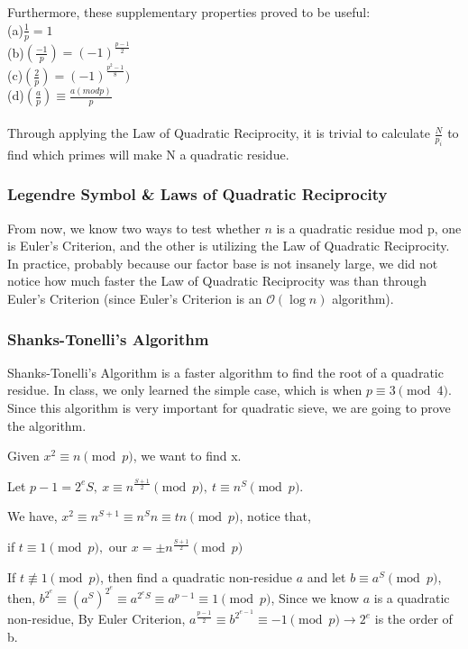 \documentclass[12pt]{article} %
\begin{document}
	\\\\Furthermore, these supplementary properties proved to be useful:
	\\(a)$\frac{1}{p} = 1$
	\\(b)$(\frac{-1}{p}) = (-1)^{\frac{p-1}{2}}$
	\\(c)$(\frac{2}{p}) = (-1)^{\frac{p^{2}-1}{8}})$
	\\(d)$(\frac{a}{p}) \equiv \frac{a(mod p)}{p}$
	\\\\
	Through applying the Law of Quadratic Reciprocity, it is trivial to calculate $\frac{N}{p_i}$ to find which primes will make N a quadratic residue.
	
	\subsubsection{Legendre Symbol \& Laws of Quadratic Reciprocity}
	
	From now, we know two ways to test whether $n$ is a quadratic residue mod p, one is Euler's Criterion, and the other is utilizing the Law of Quadratic Reciprocity. In practice, probably because our factor base is not insanely large, we did not notice how much faster the Law of Quadratic Reciprocity was than through Euler's Criterion (since Euler's Criterion is an $\mathcal{O}(\log{n}) $ algorithm).
	
	\subsubsection{Shanks-Tonelli's Algorithm}
	
	Shanks-Tonelli's Algorithm is a faster algorithm to find the root of a quadratic residue. In class, we only learned the simple case, which is when $p \equiv 3 \pmod{4}$. Since this algorithm is very important for quadratic sieve, we are going to prove the algorithm.
	
	Given $x^2 \equiv n \pmod{p} $, we want to find x.
	
	Let $p-1 = 2^eS,\ x \equiv n^{\frac{S+1}{2}} \pmod{p},\ t \equiv n^S \pmod{p}.$
	
	We have, $x^2 \equiv n^{S+1} \equiv n^Sn \equiv tn \pmod{p}$, notice that, 
	
	if $t \equiv 1 \pmod{p},$ our $x = \pm n^{\frac{S+1}{2}} \pmod{p}$
	
	If $t \not\equiv 1 \pmod{p}$, then find a quadratic non-residue $a$ and let $b \equiv a^S \pmod{p}$, then, $b^{2^e} \equiv (a^S)^{2^e} \equiv a^{2^eS} \equiv a^{p-1} \equiv 1 \pmod{p}$, Since we know $a$ is a quadratic non-residue, By Euler Criterion, $a^{\frac{p-1}{2}} \equiv b^{2^{e-1}} \equiv -1 \pmod{p} \rightarrow 2^e$ is the order of b.
	
\end{document}
